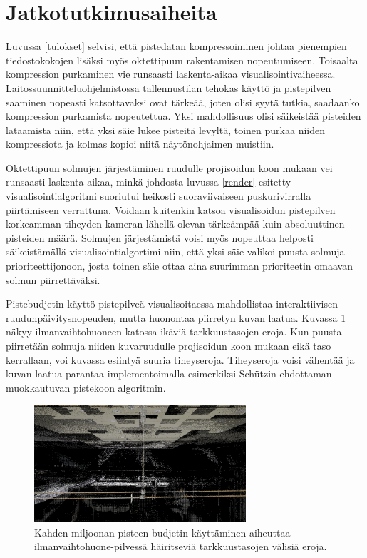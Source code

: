 \section{Jatkotutkimusaiheita}\label{jatko}

Luvussa \ref{tulokset} selvisi, että pistedatan kompressoiminen johtaa pienempien tiedostokokojen lisäksi myös oktettipuun rakentamisen nopeutumiseen. Toisaalta kompression purkaminen vie runsaasti laskenta-aikaa visualisointivaiheessa. Laitossuunnitteluohjelmistossa tallennustilan tehokas käyttö ja pistepilven saaminen nopeasti katsottavaksi ovat tärkeää, joten olisi syytä tutkia, saadaanko kompression purkamista nopeutettua. Yksi mahdollisuus olisi säikeistää pisteiden lataamista niin, että yksi säie lukee pisteitä levyltä, toinen purkaa niiden kompressiota ja kolmas kopioi niitä näytönohjaimen muistiin.

Oktettipuun solmujen järjestäminen ruudulle projisoidun koon mukaan vei runsaasti laskenta-aikaa, minkä johdosta luvussa \ref{render} esitetty visualisointialgoritmi suoriutui heikosti suoraviivaiseen puskurivirralla piirtämiseen verrattuna. Voidaan kuitenkin katsoa visualisoidun pistepilven korkeamman tiheyden kameran lähellä olevan tärkeämpää kuin absoluuttinen pisteiden määrä. Solmujen järjestämistä voisi myös nopeuttaa helposti säikeistämällä visualisointialgortimi niin, että yksi säie valikoi puusta solmuja prioriteettijonoon, josta toinen säie ottaa aina suurimman prioriteetin omaavan solmun piirrettäväksi.

Pistebudjetin käyttö pistepilveä visualisoitaessa mahdollistaa interaktiivisen ruudunpäivitysnopeuden, mutta huonontaa piirretyn kuvan laatua. Kuvassa \ref{lod_border} näkyy ilmanvaihtohuoneen katossa ikäviä tarkkuustasojen eroja. Kun puusta piirretään solmuja niiden kuvaruudulle projisoidun koon mukaan eikä taso kerrallaan, voi kuvassa esiintyä suuria tiheyseroja. Tiheyseroja voisi vähentää ja kuvan laatua parantaa implementoimalla esimerkiksi Schützin \cite{potree} ehdottaman muokkautuvan pistekoon algoritmin. 

\begin{figure}
    \centering
    \includegraphics[width=0.7\textwidth]{tuloksia/ilmastointi_2M/ilmastointihuone_vesijohto_overviewbuf.png}
    \caption{Kahden miljoonan pisteen budjetin käyttäminen aiheuttaa ilmanvaihtohuone-pilvessä häiritseviä tarkkuustasojen välisiä eroja.}
    \label{lod_border}
\end{figure}

